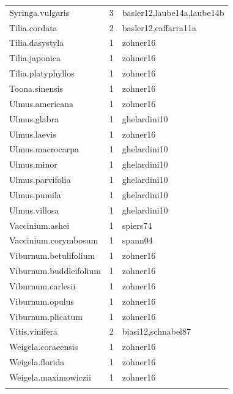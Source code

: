 \documentclass{article}
\begin{document}
\begin{footnotesize}
\begin{longtable}{|p{}|p{}|p{}|}
  Syringa.vulgaris &   3 & basler12,laube14a,laube14b \\ 
  Tilia.cordata &   2 & basler12,caffarra11a \\ 
  Tilia.dasystyla &   1 & zohner16 \\ 
  Tilia.japonica &   1 & zohner16 \\ 
  Tilia.platyphyllos &   1 & zohner16 \\ 
  Toona.sinensis &   1 & zohner16 \\ 
  Ulmus.americana &   1 & zohner16 \\ 
  Ulmus.glabra &   1 & ghelardini10 \\ 
  Ulmus.laevis &   1 & zohner16 \\ 
  Ulmus.macrocarpa &   1 & ghelardini10 \\ 
  Ulmus.minor &   1 & ghelardini10 \\ 
  Ulmus.parvifolia &   1 & ghelardini10 \\ 
  Ulmus.pumila &   1 & ghelardini10 \\ 
  Ulmus.villosa &   1 & ghelardini10 \\ 
  Vaccinium.ashei &   1 & spiers74 \\ 
  Vaccinium.corymbosum &   1 & spann04 \\ 
  Viburnum.betulifolium &   1 & zohner16 \\ 
  Viburnum.buddleifolium &   1 & zohner16 \\ 
  Viburnum.carlesii &   1 & zohner16 \\ 
  Viburnum.opulus &   1 & zohner16 \\ 
  Viburnum.plicatum &   1 & zohner16 \\ 
  Vitis.vinifera &   2 & biasi12,schnabel87 \\ 
  Weigela.coraeensis &   1 & zohner16 \\ 
  Weigela.florida &   1 & zohner16 \\ 
  Weigela.maximowiczii &   1 & zohner16 \\ 
   \hline
\hline
\label{tab:sp}
\end{longtable}
\endgroup



\end{footnotesize}
\end{document}
